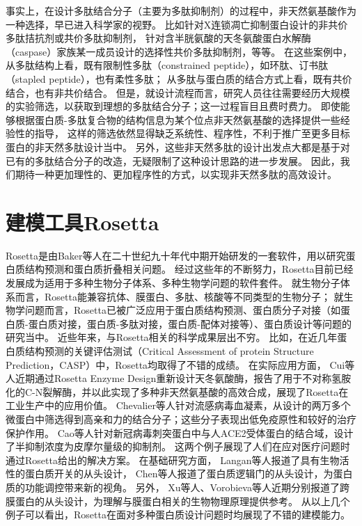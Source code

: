 事实上，在设计多肽结合分子（主要为多肽抑制剂）的过程中，非天然氨基酸作为一种选择，早已进入科学家的视野。
比如针对X连锁凋亡抑制蛋白设计的非共价多肽拮抗剂或共价多肽抑制剂，
针对含半胱氨酸的天冬氨酸蛋白水解酶（caspase）家族某一成员设计的选择性共价多肽抑制剂，等等。
在这些案例中，
从多肽结构上看，既有限制性多肽（constrained peptide），如环肽、订书肽（stapled peptide），也有柔性多肽；
从多肽与蛋白质的结合方式上看，既有共价结合，也有非共价结合。
但是，就设计流程而言，研究人员往往需要经历大规模的实验筛选，以获取到理想的多肽结合分子；这一过程盲目且费时费力。
即使能够根据蛋白质-多肽复合物的结构信息为某个位点非天然氨基酸的选择提供一些经验性的指导，
这样的筛选依然显得缺乏系统性、程序性，不利于推广至更多目标蛋白的非天然多肽设计当中。
另外，这些非天然多肽的设计出发点大都是基于对已有的多肽结合分子的改造，无疑限制了这种设计思路的进一步发展。
因此，我们期待一种更加理性的、更加程序性的方式，以实现非天然多肽的高效设计。



\section{建模工具Rosetta}

Rosetta是由Baker等人在二十世纪九十年代中期开始研发的一套软件，用以研究蛋白质结构预测和蛋白质折叠相关问题。
经过这些年的不断努力，Rosetta目前已经发展成为适用于多种生物分子体系、多种生物学问题的软件套件。
就生物分子体系而言，Rosetta能兼容抗体、膜蛋白、多肽、核酸等不同类型的生物分子；
就生物学问题而言，Rosetta已被广泛应用于蛋白质结构预测、蛋白质分子对接（如蛋白质-蛋白质对接，蛋白质-多肽对接，蛋白质-配体对接等）、蛋白质设计等问题的研究当中。
近些年来，与Rosetta相关的科学成果层出不穷。
比如，在近几年蛋白质结构预测的关键评估测试（Critical Assessment of protein Structure Prediction，CASP）中，Rosetta均取得了不错的成绩。
在实际应用方面，
Cui等人近期通过Rosetta Enzyme Design重新设计天冬氨酸酶，报告了用于不对称氢胺化的C-N裂解酶，并以此实现了多种非天然氨基酸的高效合成，展现了Rosetta在工业生产中的应用价值。
Chevalier等人针对流感病毒血凝素，从设计的两万多个微蛋白中筛选得到高亲和力的结合分子；这些分子表现出低免疫原性和较好的治疗保护作用。
Cao等人针对新冠病毒刺突蛋白中与人ACE2受体蛋白的结合域，设计了半抑制浓度为皮摩尔量级的抑制剂。
这两个例子展现了人们在应对医疗问题时通过Rosetta给出的解决方案。
在基础研究方面，
Langan等人报道了具有生物活性的蛋白质开关的从头设计，
Chen等人报道了蛋白质逻辑门的从头设计，为蛋白质的功能调控带来新的视角。
另外， Xu等人、Vorobieva等人近期分别报道了跨膜蛋白的从头设计，为理解与膜蛋白相关的生物物理原理提供参考。
从以上几个例子可以看出，Rosetta在面对多种蛋白质设计问题时均展现了不错的建模能力。

